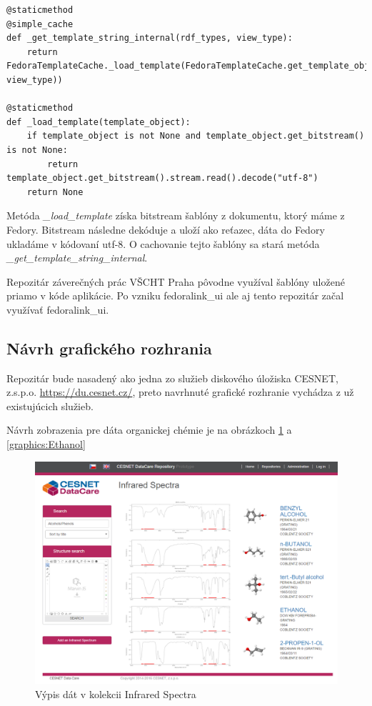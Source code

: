 \documentclass[thesis=M,slovak]{FITthesis}[2013/05/06]
\begin{document}
\begin{lstlisting}[frame=single] 
@staticmethod
@simple_cache
def _get_template_string_internal(rdf_types, view_type):
    return FedoraTemplateCache._load_template(FedoraTemplateCache.get_template_object(rdf_types, view_type))

@staticmethod
def _load_template(template_object):
    if template_object is not None and template_object.get_bitstream() is not None:
        return template_object.get_bitstream().stream.read().decode("utf-8")
    return None
\end{lstlisting}
Metóda {\em \_load\_template} získa bitstream šablóny z dokumentu, ktorý máme z Fedory. Bitstream následne dekóduje a uloží ako reťazec, dáta do Fedory ukladáme v kódovaní \mbox{utf-8}. O cachovanie tejto šablóny sa stará metóda {\em \_get\_template\_string\_internal}.

Repozitár záverečných prác VŠCHT Praha pôvodne využíval šablóny uložené priamo v kóde aplikácie. Po vzniku fedoralink\_ui ale aj tento repozitár začal využívať fedoralink\_ui.

\subsection{Návrh grafického rozhrania}
Repozitár bude nasadený ako jedna zo služieb diskového úložiska CESNET, z.s.p.o. \url{https://du.cesnet.cz/}, preto navrhnuté grafické rozhranie vychádza z už existujúcich služieb.

Návrh zobrazenia pre dáta organickej chémie je na obrázkoch \ref{graphics:listInfrared} a \ref{graphics:Ethanol}
\begin{figure}\centering
	\includegraphics[width=1.0\textwidth]{grafika/list_InfraredSpectra.png}
 	\caption[Výpis dát v kolekcii InfraredSpectra]{Výpis dát v kolekcii Infrared Spectra}\label{graphics:listInfrared}
\end{figure}
\end{document}
